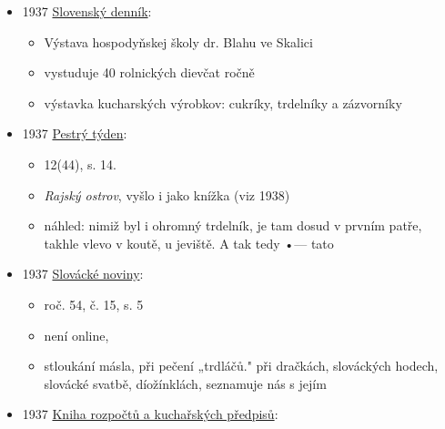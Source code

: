 \begin{itemize}
  \begin{itemize}
  \tightlist
  \item
    Dr. Blaho v Luhačoviciach
  \item
    lázeňský lékař, slovenský vlastenech
  \item
    pořádal setkání v Búdě, kde se podávalo skalické víno a trdelníky
  \end{itemize}
\item
  1937
  \href{https://dikda.snk.sk/uuid/uuid:5dd3499d-de07-4a5e-ab8a-f52a6c881c09}{Slovenský
  denník}:

  \begin{itemize}
  \tightlist
  \item
    Výstava hospodyňskej školy dr. Blahu ve Skalici
  \item
    vystuduje 40 rolnických dievčat ročně
  \item
    výstavka kucharských výrobkov: cukríky, trdelníky a zázvorníky
  \end{itemize}
\item
  1937
  \href{https://www.digitalniknihovna.cz/cuni_fsv/uuid/uuid:b2fcbbc0-435d-11dd-b505-00145e5790ea}{Pestrý
  týden}:

  \begin{itemize}
  \tightlist
  \item
    12(44), s. 14.
  \item
    \emph{Rajský ostrov}, vyšlo i jako knížka (viz 1938)
  \item
    náhled: nimiž byl i ohromný trdelník, je tam dosud v prvním patře,
    takhle vlevo v koutě, u jeviště. A tak tedy •--- tato
  \end{itemize}
\item
  1937
  \href{https://www.digitalniknihovna.cz/vkol/uuid/uuid:826b542b-6464-44e1-80d9-ba2d7a466c52}{Slovácké
  noviny}:

  \begin{itemize}
  \tightlist
  \item
    roč. 54, č. 15, s. 5
  \item
    není online, 
  \item
    stloukání másla, při pečení „trdláčů." při dračkách, slováckých
    hodech, slovácké svatbě, díožínklách, seznamuje nás s jejím
  \end{itemize}
\item
  1937
  \href{https://ceskadigitalniknihovna.cz/uuid/uuid:894bd2ce-7f7c-4cca-865d-b93d994e9b2a}{Kniha
  rozpočtů a kuchařských předpisů}:


\end{itemize}
